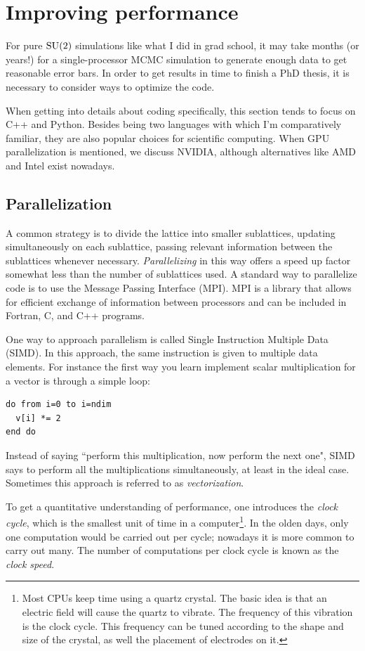 \section{Improving performance}

For pure $\operatorname{SU}(2)$ simulations like what I did in grad school, 
it may take months (or years!) for a single-processor MCMC simulation to
generate enough data to get reasonable error bars. In order to get
results in time to finish a PhD thesis, it is necessary to consider ways to
optimize the code.

When getting into details about coding specifically, this section tends to focus
on C++ and Python. Besides being two languages with which I'm comparatively
familiar, they are also popular choices for scientific computing. When GPU
parallelization is mentioned, we discuss NVIDIA, although alternatives like AMD
and Intel exist nowadays.

\subsection{Parallelization}

A common strategy is to divide the lattice into smaller sublattices, updating
simultaneously on each sublattice, passing relevant information between the
sublattices whenever necessary. {\it Parallelizing} 
in this way offers a speed
up factor somewhat less than the number of sublattices used. A standard way to
parallelize code is to use the Message Passing Interface (MPI). MPI 
is a library that allows for efficient exchange of information between processors 
and can be included in Fortran, C, and C++ programs.

One way to approach parallelism is called Single Instruction Multiple
Data (SIMD). In this approach, the same instruction is given to
multiple data elements. For instance the first way you learn implement scalar
multiplication for a vector is through a simple loop:
\begin{verbatim}
do from i=0 to i=ndim
  v[i] *= 2
end do
\end{verbatim}
Instead of saying ``perform this multiplication, now perform the next one", SIMD
says to perform all the multiplications simultaneously, at least in the ideal
case. Sometimes this approach is referred to as {\it
vectorization}.

To get a quantitative understanding of performance, one introduces
the {\it clock cycle}, which is the smallest unit of
time in a computer\footnote{Most CPUs keep time using a quartz crystal.
The basic idea is that an electric field will cause the quartz to
vibrate. The frequency of this vibration is the clock cycle.
This frequency can be tuned according to the shape and size of the
crystal, as well the placement of electrodes on it.}.
In the olden days, only one computation would be carried out per cycle;
nowadays it is more common to carry out many. The number of
computations per clock cycle is known as the {\it clock speed}.

